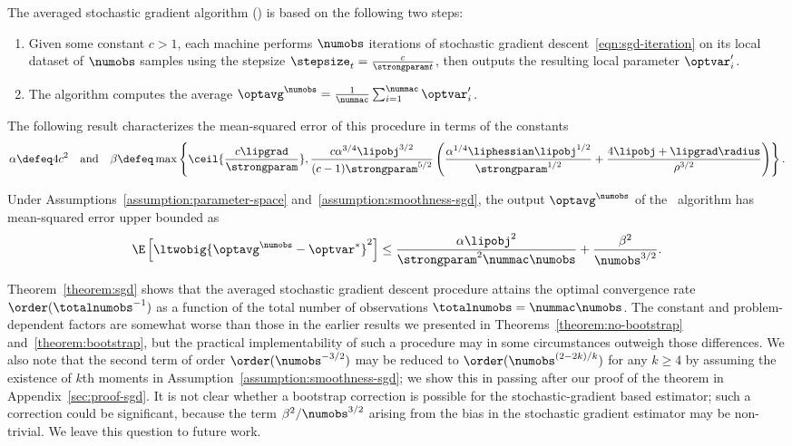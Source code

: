 \documentclass[11pt,twoside]{article}
\theoremstyle{definition}
\begin{document}
The averaged stochastic gradient algorithm
(\sgdavgm) is based on the following two steps:
\begin{enumerate}
\item[(1)] Given some constant $c > 1$, each machine performs
  $\numobs$ iterations of stochastic gradient
  descent~\eqref{eqn:sgd-iteration} on its local dataset of $\numobs$
  samples using the stepsize $\stepsize_t = \frac{c}{\strongparam t}$,
  then outputs the resulting local parameter $\optvar'_i$.
%
\item[(2)] The algorithm computes the average $\optavg^\numobs =
  \frac{1}{\nummac} \sum_{i=1}^\nummac \optvar'_i$.
\end{enumerate}
%
The following result characterizes the mean-squared error of this
procedure in terms of the constants
\begin{equation*}
  \alpha \defeq 4c^2 \quad
  \mbox{and} \quad
  \beta \defeq \max\left\{\ceil{\frac{c
      \lipgrad}{\strongparam}}, \frac{c \alpha^{3/4}
    \lipobj^{3/2}}{(c - 1)\strongparam^{5/2}} \left(
  \frac{\alpha^{1/4} \liphessian \lipobj^{1/2}}{\strongparam^{1/2}}
  + \frac{4 \lipobj + \lipgrad \radius}{\rho^{3/2}} \right)\right\}.
\end{equation*}
\begin{theorem}
  \label{theorem:sgd}
  Under Assumptions~\ref{assumption:parameter-space}
  and~\ref{assumption:smoothness-sgd}, the output $\optavg^\numobs$ of
  the \savgm\ algorithm has mean-squared error upper bounded as
  \begin{equation}
    \E\left[\ltwobig{\optavg^\numobs - \optvar^*}^2\right]
    \leq
    \frac{\alpha \lipobj^2}{\strongparam^2 \nummac \numobs} +
    \frac{\beta^2}{\numobs^{3/2}}.
    \label{eqn:sgd-bound}
  \end{equation}
\end{theorem}

Theorem~\ref{theorem:sgd} shows that the averaged stochastic gradient descent
procedure attains the optimal convergence rate $\order(\totalnumobs^{-1})$
as a function of the total
number of observations $\totalnumobs = \nummac \numobs$. The constant and
problem-dependent factors
are somewhat worse than those in the earlier results we presented in
Theorems~\ref{theorem:no-bootstrap} and~\ref{theorem:bootstrap}, but the
practical implementability of such a procedure may in some circumstances
outweigh those differences. We also note that the second term of order
$\order(\numobs^{-3/2})$ may be reduced to $\order(\numobs^{(2-2k)/k})$ for
any $k \ge 4$ by assuming the existence of $k$th moments in
Assumption~\ref{assumption:smoothness-sgd}; we show this in passing after our
proof of the theorem in Appendix~\ref{sec:proof-sgd}.  It is not clear whether
a bootstrap correction is possible for the stochastic-gradient based
estimator; such a correction could be significant, because the term $\beta^2 /
\numobs^{3/2}$ arising from the bias in the stochastic gradient estimator may
be non-trivial. We leave this question to future work.
\end{document}

